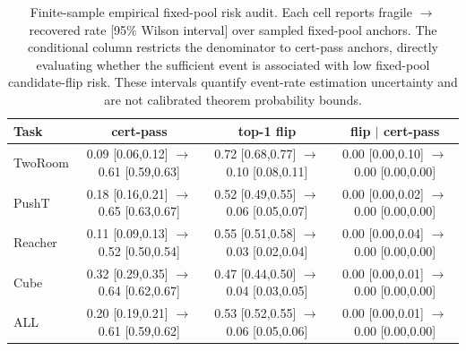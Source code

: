 \begin{table}[H]
\centering
\caption{Finite-sample empirical fixed-pool risk audit. Each cell reports fragile $\to$ recovered rate [95\% Wilson interval] over sampled fixed-pool anchors. The conditional column restricts the denominator to cert-pass anchors, directly evaluating whether the sufficient event is associated with low fixed-pool candidate-flip risk. These intervals quantify event-rate estimation uncertainty and are not calibrated theorem probability bounds.}
\label{tab:sample-level-event-rate-ci}
\footnotesize
\setlength{\tabcolsep}{2.5pt}
\begin{tabular}{lccc}
\toprule
Task & cert-pass & top-1 flip & flip $\mid$ cert-pass \\
\midrule
TwoRoom & 0.09 [0.06,0.12] $\to$ 0.61 [0.59,0.63] & 0.72 [0.68,0.77] $\to$ 0.10 [0.08,0.11] & 0.00 [0.00,0.10] $\to$ 0.00 [0.00,0.00] \\
PushT & 0.18 [0.16,0.21] $\to$ 0.65 [0.63,0.67] & 0.52 [0.49,0.55] $\to$ 0.06 [0.05,0.07] & 0.00 [0.00,0.02] $\to$ 0.00 [0.00,0.00] \\
Reacher & 0.11 [0.09,0.13] $\to$ 0.52 [0.50,0.54] & 0.55 [0.51,0.58] $\to$ 0.03 [0.02,0.04] & 0.00 [0.00,0.04] $\to$ 0.00 [0.00,0.00] \\
Cube & 0.32 [0.29,0.35] $\to$ 0.64 [0.62,0.67] & 0.47 [0.44,0.50] $\to$ 0.04 [0.03,0.05] & 0.00 [0.00,0.01] $\to$ 0.00 [0.00,0.00] \\
ALL & 0.20 [0.19,0.21] $\to$ 0.61 [0.59,0.62] & 0.53 [0.52,0.55] $\to$ 0.06 [0.05,0.06] & 0.00 [0.00,0.01] $\to$ 0.00 [0.00,0.00] \\
\bottomrule
\end{tabular}
\end{table}
